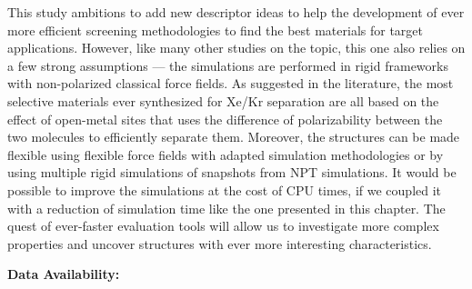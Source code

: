 \documentclass[main]{subfiles}
\begin{document}
This study ambitions to add new descriptor ideas to help the development of ever more efficient screening methodologies to find the best materials for target applications. However, like many other studies on the topic, this one also relies on a few strong assumptions --- the simulations are performed in rigid frameworks with non-polarized classical force fields. As suggested in the literature, the most selective materials ever synthesized for Xe/Kr separation are all based on the effect of open-metal sites that uses the difference of polarizability between the two molecules to efficiently separate them.\autocite{Li_2019, Pei_2022} Moreover, the structures can be made flexible using flexible force fields with adapted simulation methodologies\autocite{Bousquet2012} or by using multiple rigid simulations of snapshots from NPT simulations\autocite{Witman_2017}.
It would be possible to improve the simulations at the cost of CPU times, if we coupled it with a reduction of simulation time like the one presented in this chapter. The quest of ever-faster evaluation tools will allow us to investigate more complex properties and uncover structures with ever more interesting characteristics.


\vspace{2cm}

\textbf{Data Availability:} \url{} 

\OnlyInSubfile{\printglobalbibliography}
\end{document}
